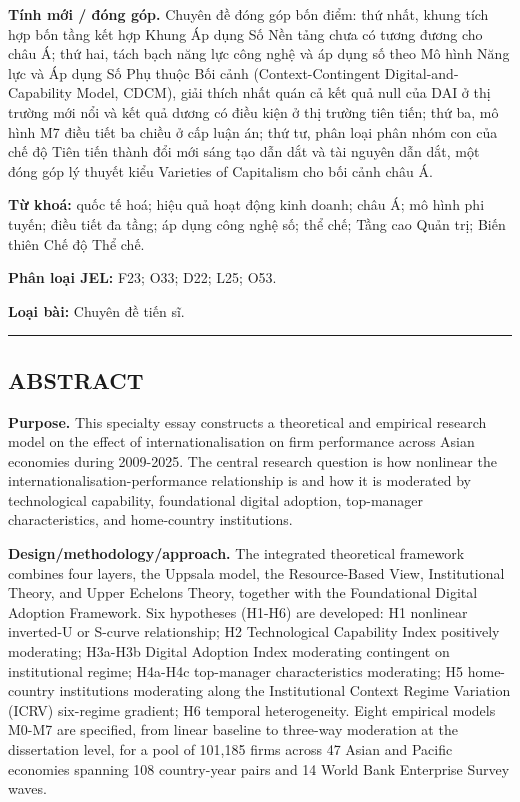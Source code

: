 \documentclass[12pt,a4paper]{article}
\begin{document}
\textbf{Tính mới / đóng góp.} Chuyên đề đóng góp bốn điểm: thứ nhất,
khung tích hợp bốn tầng kết hợp Khung Áp dụng Số Nền tảng chưa có tương
đương cho châu Á; thứ hai, tách bạch năng lực công nghệ và áp dụng số
theo Mô hình Năng lực và Áp dụng Số Phụ thuộc Bối cảnh
(Context-Contingent Digital-and-Capability Model, CDCM), giải thích nhất
quán cả kết quả null của DAI ở thị trường mới nổi và kết quả dương có
điều kiện ở thị trường tiên tiến; thứ ba, mô hình M7 điều tiết ba chiều
ở cấp luận án; thứ tư, phân loại phân nhóm con của chế độ Tiên tiến
thành đổi mới sáng tạo dẫn dắt và tài nguyên dẫn dắt, một đóng góp lý
thuyết kiểu Varieties of Capitalism cho bối cảnh châu Á.

\textbf{Từ khoá:} quốc tế hoá; hiệu quả hoạt động kinh doanh; châu Á; mô
hình phi tuyến; điều tiết đa tầng; áp dụng công nghệ số; thể chế; Tầng
cao Quản trị; Biến thiên Chế độ Thể chế.

\textbf{Phân loại JEL:} F23; O33; D22; L25; O53.

\textbf{Loại bài:} Chuyên đề tiến sĩ.

\begin{center}\rule{0.5\linewidth}{0.5pt}\end{center}

\hypertarget{abstract}{%
\subsection{ABSTRACT}\label{abstract}}

\textbf{Purpose.} This specialty essay constructs a theoretical and
empirical research model on the effect of internationalisation on firm
performance across Asian economies during 2009-2025. The central
research question is how nonlinear the internationalisation-performance
relationship is and how it is moderated by technological capability,
foundational digital adoption, top-manager characteristics, and
home-country institutions.

\textbf{Design/methodology/approach.} The integrated theoretical
framework combines four layers, the Uppsala model, the Resource-Based
View, Institutional Theory, and Upper Echelons Theory, together with the
Foundational Digital Adoption Framework. Six hypotheses (H1-H6) are
developed: H1 nonlinear inverted-U or S-curve relationship; H2
Technological Capability Index positively moderating; H3a-H3b Digital
Adoption Index moderating contingent on institutional regime; H4a-H4c
top-manager characteristics moderating; H5 home-country institutions
moderating along the Institutional Context Regime Variation (ICRV)
six-regime gradient; H6 temporal heterogeneity. Eight empirical models
M0-M7 are specified, from linear baseline to three-way moderation at the
dissertation level, for a pool of 101,185 firms across 47 Asian and
Pacific economies spanning 108 country-year pairs and 14 World Bank
Enterprise Survey waves.
\end{document}
